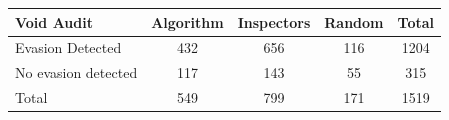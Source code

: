 {
\def\sym#1{\ifmmode^{#1}\else\(^{#1}\)\fi}
\begin{tabular}{l*{4}{c}}
\toprule
Void Audit  &   Algorithm&  Inspectors&      Random&       Total\\
\midrule
Evasion Detected&         432&         656&         116&        1204\\
No evasion detected&         117&         143&          55&         315\\
Total       &         549&         799&         171&        1519\\
\bottomrule
\end{tabular}
}
